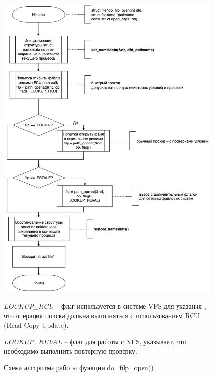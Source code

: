 \begin{figure}[h!]
	\begin{center}
		\includegraphics[width=140mm]{images/do_filp_open}
	\end{center}
	\caption{Схема алгоритма работы функции do\_filp\_open()}
	\label{img:flip}
	
	 \textit{LOOKUP\_RCU} -- флаг используется в системе VFS  для указания , что операция поиска должна выполняться с использованием RCU (Read-Copy-Update). 
	
	\textit{LOOKUP\_REVAL} --  флаг для работы с NFS, указывает, что необходимо выполнить повторную проверку.
	
\end{figure}


